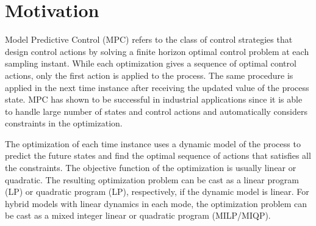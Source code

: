 \section{Motivation}\label{sec:example}

Model Predictive Control (MPC) refers to the class of control strategies that design control actions by solving a finite horizon optimal control problem at each sampling instant. While each optimization gives a sequence of optimal control actions, only the first action is applied to the process. The same procedure is applied in the next time instance after receiving the updated value of the process state. MPC has shown to be successful in industrial applications since it is able to handle large number of states and control actions and automatically considers constraints in the optimization.

The optimization of each time instance uses a dynamic model of the process to predict the future states and find the optimal sequence of actions that satisfies all the constraints. The objective function of the optimization is usually linear or quadratic. The resulting optimization problem can be cast as a linear program (LP) or quadratic program (LP), respectively, if the dynamic model is linear. For hybrid models with linear dynamics in each mode, the optimization problem can be cast as a mixed integer linear or quadratic program (MILP/MIQP). 

